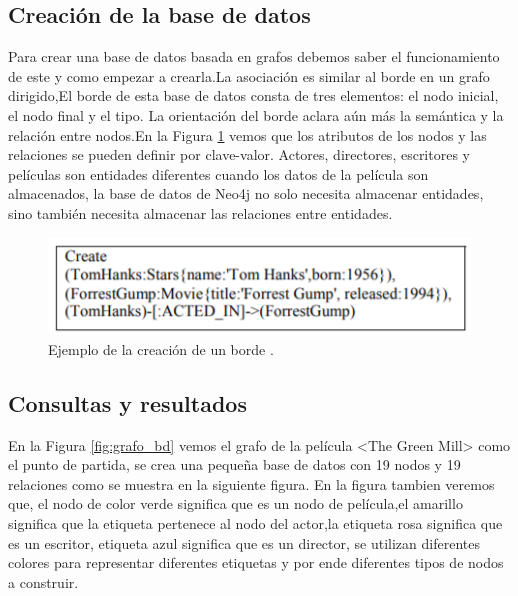 \subsection{Creación de la base de datos}
Para crear una base de datos basada en grafos debemos saber el funcionamiento de este y como empezar a crearla.La asociación es similar al borde en un grafo dirigido,El borde de esta base de datos consta de tres elementos: el nodo inicial, el nodo final y el tipo.
La orientación del borde aclara aún más la semántica y la
relación entre nodos.En la Figura \ref{fig:borde} vemos que los atributos de los nodos y las relaciones se pueden definir por clave-valor. Actores, directores,
escritores y películas son entidades diferentes cuando los datos de la película son almacenados, la base de datos de Neo4j no solo necesita almacenar entidades, sino también necesita almacenar las relaciones entre entidades.
\begin{figure}[H]
    \centering
    \includegraphics[scale=0.8]{Graficos/ejemplo.png}
    \caption{Ejemplo de la creación de un borde  \cite{lu2017analysis}.}
    \label{fig:borde}
\end{figure}
\subsection{Consultas y resultados}
En la Figura \ref{fig:grafo_bd} vemos el grafo de la película <The Green Mill> como el punto de partida, se crea una pequeña base de datos con 19 nodos y 19
relaciones como se muestra en la siguiente figura. En la figura tambien veremos que, el nodo de color verde significa que es un nodo de película,el amarillo significa que la etiqueta pertenece al nodo del actor,la etiqueta rosa significa que es un escritor, etiqueta azul significa que es un director, se utilizan diferentes colores para representar diferentes etiquetas y por ende diferentes tipos de nodos a construir.

